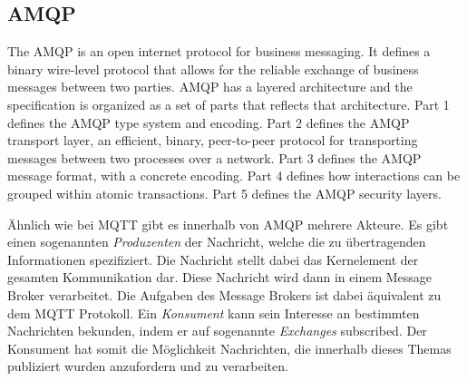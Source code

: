 \subsection{AMQP}

\begin{definition}
    The \ac{AMQP} is an open internet protocol for business messaging. It defines a binary wire-level protocol that allows for the reliable exchange of business messages between two parties. AMQP has a layered architecture and the specification is organized as a set of parts that reflects that architecture. Part 1 defines the AMQP type system and encoding. Part 2 defines the AMQP transport layer, an efficient, binary, peer-to-peer protocol for transporting messages between two processes over a network. Part 3 defines the AMQP message format, with a concrete encoding. Part 4 defines how interactions can be grouped within atomic transactions. Part 5 defines the AMQP security layers.
\end{definition}

Ähnlich wie bei \ac{MQTT} gibt es innerhalb von \ac{AMQP} mehrere Akteure. Es gibt einen sogenannten \textit{Produzenten} der Nachricht, welche die zu übertragenden Informationen spezifiziert. Die Nachricht stellt dabei das Kernelement der gesamten Kommunikation dar. Diese Nachricht wird dann in einem Message Broker verarbeitet. Die Aufgaben des Message Brokers ist dabei äquivalent zu dem \ac{MQTT} Protokoll. Ein \textit{Konsument} kann sein Interesse an bestimmten Nachrichten bekunden, indem er auf sogenannte \textit{Exchanges} subscribed. Der Konsument hat somit die Möglichkeit Nachrichten, die innerhalb dieses Themas publiziert wurden anzufordern und zu verarbeiten.

